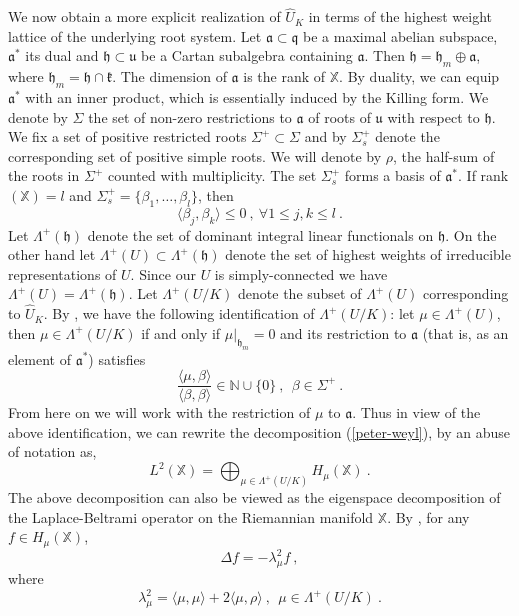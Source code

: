 \documentclass[12pt]{amsart}
\theoremstyle{definition}
\newcommand{\what}{\widehat}
\newcommand{\N}{\mathbb N}%
\newcommand{\X}{\mathbb X}%
\numberwithin{equation}{section}
\begin{document}
We now obtain a more explicit realization of  $\what{U}_K$ in terms of the highest weight lattice of the underlying root system. Let $\mathfrak{a} \subset \mathfrak{q}$ be a maximal abelian subspace, $\mathfrak{a}^*$ its dual and $\mathfrak{h} \subset \mathfrak{u}$ be a Cartan subalgebra containing $\mathfrak{a}$. Then $\mathfrak{h} = \mathfrak{h}_m \oplus \mathfrak{a}$, where $\mathfrak{h}_m = \mathfrak{h} \cap \mathfrak{k}$. The dimension of $\mathfrak{a}$ is the rank of $\X$. By duality, we can equip $\mathfrak{a}^*$ with an inner product, which is essentially induced by the Killing form. We denote by $\Sigma$ the set of non-zero restrictions to $\mathfrak{a}$ of roots of $\mathfrak{u}$ with respect to $\mathfrak{h}$.    We fix a set of positive restricted roots $\Sigma^+ \subset \Sigma$ and by $\Sigma^+_s$ denote the corresponding set of positive simple roots. We will denote by $\rho$, the half-sum of the roots in $\Sigma^+$ counted with multiplicity. The set $\Sigma^+_s$ forms a basis of $\mathfrak{a}^*$. If rank$(\X)=l$ and $\Sigma^+_s =\{\beta_1, \dots, \beta_l\}$, then \cite[Chap. VII, Lemma 2.18]{HelgasonDiff}
\begin{equation} \label{negative_killing_form}
\langle \beta_j,\beta_k \rangle \le 0\:,\:\forall 1 \le j , k \le l\:.
\end{equation}
Let $\Lambda^+(\mathfrak{h})$ denote the set of dominant integral linear functionals on $\mathfrak{h}$.  On the other hand let $\Lambda^+(U) \subset \Lambda^+(\mathfrak{h})$ denote the set of highest weights of irreducible representations of $U$. Since our $U$ is simply-connected we have $\Lambda^+(U) = \Lambda^+(\mathfrak{h})$. Let $\Lambda^+(U/K)$ denote the subset of $\Lambda^+(U)$ corresponding to $\what{U}_K$. By \cite[Theorem 4.1, p. 535]{Helgason}, we have the following identification of $\Lambda^+(U/K)$: let $\mu \in \Lambda^+(U)$, then $\mu \in \Lambda^+(U/K)$ if and only if $\mu|_{\mathfrak{h}_m}=0$ and its restriction to $\mathfrak{a}$ (that is, as an element of $\mathfrak{a}^*$) satisfies
\begin{equation*}
\frac{\langle \mu, \beta \rangle}{\langle \beta, \beta \rangle} \in \N \cup \{0\}\:,\:\: \beta \in \Sigma^+\:.
\end{equation*}
From here on we will work with the restriction of $\mu$ to $\mathfrak{a}$. Thus in view of the above identification, we can rewrite the decomposition (\ref{peter-weyl}), by an abuse of notation as,
\begin{equation*}
L^2(\X) = \bigoplus_{\mu \in \Lambda^+(U/K)} H_\mu(\X)\:.
\end{equation*}
The above decomposition can also be viewed as the eigenspace decomposition of the Laplace-Beltrami operator on the Riemannian manifold $\X$. By \cite[Lemma 1, Section 6.6, p. 367]{Pro}, for any $f \in H_\mu(\X)$,
\begin{equation*}
\Delta f = -\lambda^2_\mu f\:,
\end{equation*}
where
\begin{equation} \label{eigenvalues}
\lambda^2_\mu = \langle \mu,\mu \rangle + 2 \langle \mu, \rho \rangle\:,\:\: \mu \in \Lambda^+(U/K)\:.
\end{equation}
\end{document}
